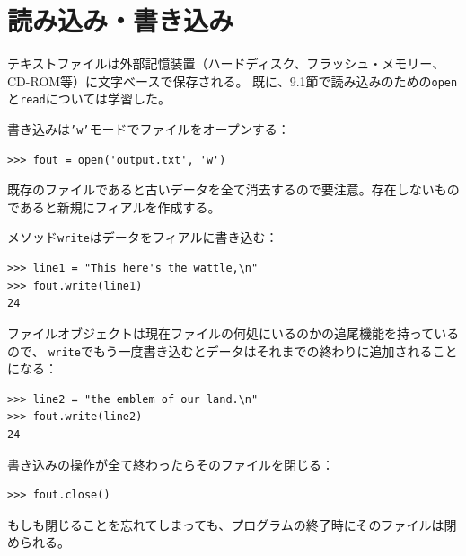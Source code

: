 \documentclass[a4j,12pt,makeidx]{jbook}
\begin{document}
\section{読み込み・書き込み}
テキストファイルは外部記憶装置（ハードディスク、フラッシュ・メモリー、CD-ROM等）に文字ベースで保存される。
既に、9.1節で読み込みのための{\tt open}と{\tt read}については学習した。 \par
書き込みは{\tt 'w'}モードでファイルをオープンする：
\begin{verbatim}
>>> fout = open('output.txt', 'w')
\end{verbatim}
既存のファイルであると古いデータを全て消去するので要注意。存在しないものであると新規にフィアルを作成する。\par
メソッド{\tt write}はデータをフィアルに書き込む：
\begin{verbatim}
>>> line1 = "This here's the wattle,\n"
>>> fout.write(line1)
24
\end{verbatim}
ファイルオブジェクトは現在ファイルの何処にいるのかの追尾機能を持っているので、
{\tt write}でもう一度書き込むとデータはそれまでの終わりに追加されることになる：
\begin{verbatim}
>>> line2 = "the emblem of our land.\n"
>>> fout.write(line2)
24
\end{verbatim}
書き込みの操作が全て終わったらそのファイルを閉じる：
\begin{verbatim}
>>> fout.close()
\end{verbatim}
もしも閉じることを忘れてしまっても、プログラムの終了時にそのファイルは閉められる。
%
\end{document}
